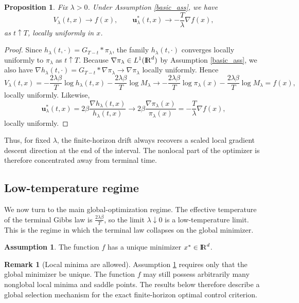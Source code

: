 \documentclass[11pt]{amsart}
\def\R{\mathrm{I\kern-0.21emR}}
\numberwithin{equation}{section}
\numberwithin{figure}{section}
\newtheorem{proposition}[theorem]{Proposition}%
\theoremstyle{definition}\newtheorem{remark}[theorem]{Remark}%
\newtheorem{assumption}[theorem]{Assumption}
\begin{document}
\begin{proposition}\label{terminal_limit}
Fix $\lambda > 0$. Under Assumption \ref{basic_ass}, we have
$$
V_\lambda(t,x) \to f(x),
\qquad
\mathbf u_\lambda^*(t,x) \to - \frac{T}{\lambda}\nabla f(x),
$$
as $t \uparrow T$, locally uniformly in $x$.
\end{proposition}

\begin{proof}
Since $h_\lambda(t,\cdot) = G_{T-t} * \pi_\lambda$, the family $h_\lambda(t,\cdot)$ converges locally uniformly to $\pi_\lambda$ as $t \uparrow T$. Because $\nabla \pi_\lambda \in L^1(\R^d)$ by Assumption \ref{basic_ass}, we also have
$\nabla h_\lambda(t,\cdot) = G_{T-t} * \nabla \pi_\lambda \to \nabla \pi_\lambda$
locally uniformly. Hence
$$
V_\lambda(t,x)
=
- \frac{2\lambda\beta}{T}\log h_\lambda(t,x) - \frac{2\lambda\beta}{T}\log M_\lambda
\longrightarrow
- \frac{2\lambda\beta}{T}\log \pi_\lambda(x) - \frac{2\lambda\beta}{T}\log M_\lambda
= f(x),
$$
locally uniformly. Likewise,
$$
\mathbf u_\lambda^*(t,x) = 2\beta \frac{\nabla h_\lambda(t,x)}{h_\lambda(t,x)} 
\longrightarrow
2\beta \frac{\nabla \pi_\lambda(x)}{\pi_\lambda(x)} = - \frac{T}{\lambda}\nabla f(x),
$$
locally uniformly.
\end{proof}

Thus, for fixed $\lambda$, the finite-horizon drift always recovers a scaled local gradient descent direction at the end of the interval. The nonlocal part of the optimizer is therefore concentrated away from terminal time.




\subsection{Low-temperature regime}

We now turn to the main global-optimization regime. The effective temperature of the terminal Gibbs law is $\displaystyle \frac{2\lambda\beta}{T}$, so the limit $\lambda \downarrow 0$ is a low-temperature limit. This is the regime in which the terminal law collapses on the global minimizer.

\begin{assumption}\label{unique_min}
The function $f$ has a unique minimizer $x^* \in \R^d$.
\end{assumption}

\begin{remark}[Local minima are allowed]\label{local_min_remark}
Assumption \ref{unique_min} requires only that the global minimizer be unique. The function $f$ may still possess arbitrarily many nonglobal local minima and saddle points. The results below therefore describe a global selection mechanism for the exact finite-horizon optimal control criterion.
\end{remark}
\end{document}
